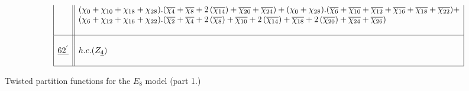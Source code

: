\documentclass[a4paper,11pt]{article}
\newcommand{\ch}[1]{\chi_{#1}}
\newcommand{\och}[1]{\overline{\chi_{#1}}}
\newcommand{\ud}[1]{\underline{#1}}
\begin{document}
\begin{table}
$$\begin{array}{|c||l|}
{}  & (\ch{0} + \ch{10} + \ch{18} + \ch{28}).(\och{4} + \och{8} +
2\,(\och{14}) + \och{20} + \och{24})
+ (\ch{0} + \ch{28}).(\och{6} + \och{10} + \och{12} + \och{16} +
\och{18} + \och{22}) + \\
{}  & (\ch{6} + \ch{12} + \ch{16} + \ch{22}).(\och{2} + \och{4} +
2\,(\och{8}) +  \och{10} + 2\,(\och{14}) + \och{18} + 2\,(\och{20}) +
\och{24} + \och{26}) \\
{}  & {} \\
\hline
{}  & {} \\
\ud{62^{'}}  & h.c. (Z_{\ud4}) \\
{}  &  {}  \\
\hline
\end{array}
$$
\normalsize
\caption{Twisted partition functions for the $E_8$ model (part 1.)}
\end{table}
\end{document}
